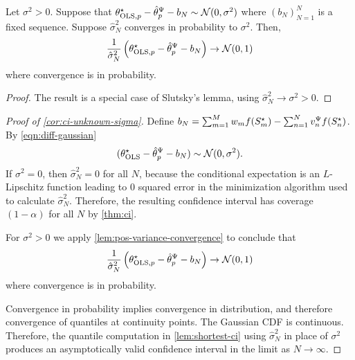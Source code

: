 \begin{lemma}\label{lem:pos-variance-convergence}
Let $\sigma^2 >0$. Suppose that $\theta^{\star}_{\text{OLS},p}  -  \hat{\theta}_p^{\Psi} -b_N \sim \mathcal{N}(0, \sigma^2)$ where $(b_N)_{N=1}^N$ is a fixed sequence. Suppose $\hat{\sigma}^2_N$ converges in probability to $\sigma^2$. Then,
\begin{align}
    \frac{1}{\hat{\sigma}^2_N}\left(\theta^{\star}_{\text{OLS},p}  -  \hat{\theta}_p^{\Psi} -b_N\right) \to \mathcal{N}(0, 1)
\end{align}
where convergence is in probability.
\end{lemma}
\begin{proof}
    The result is a special case of Slutsky's lemma, using $\hat{\sigma}^2_N \to \sigma^2 >0$.
\end{proof}


 \begin{proof}[Proof of \cref{cor:ci-unknown-sigma}]
     Define $b_N = \sum_{m=1}^M w_m f(S^{\star}_m) - \sum_{n=1}^N v_n^{\Psi}f(S^{\star}_n)$. By \cref{eqn:diff-gaussian}
     \begin{align}
         (\theta^{\star}_{\text{OLS}} -  \hat{\theta}_p^{\Psi} -b_N)\sim \mathcal{N}(0, \sigma^2).
     \end{align}
     If $\sigma^2 = 0$, then $\hat{\sigma}^2_N = 0$ for all $N$, because the conditional expectation is an $L$-Lipschitz function leading to $0$ squared error in the minimization algorithm used to calculate $\hat{\sigma}^2_N$. Therefore, the resulting confidence interval has coverage $(1-\alpha)$ for all $N$ by \cref{thm:ci}. 
     
     For $\sigma^2 > 0 $ we apply \cref{lem:pos-variance-convergence} to conclude that 
     \begin{align}
    \frac{1}{\hat{\sigma}^2_N}\left(\theta^{\star}_{\text{OLS},p}  -  \hat{\theta}_p^{\Psi} -b_N\right) \to \mathcal{N}(0, 1)
     \end{align}
     where convergence is in probability. 
     
     Convergence in probability implies convergence in distribution, and therefore convergence of quantiles at continuity points. The Gaussian CDF is continuous. Therefore, the quantile computation in \cref{lem:shortest-ci} using $\hat{\sigma}^2_N$ in place of $\sigma^2$ produces an asymptotically valid confidence interval in the limit as $N \to \infty$. 

 \end{proof}